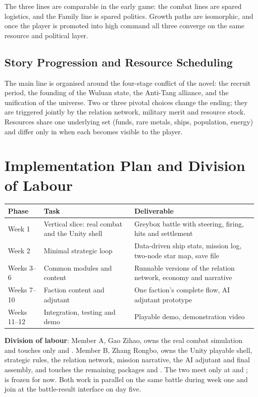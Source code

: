 \documentclass[11pt,a4paper]{article}
\begin{document}
The three lines are comparable in the early game: the combat lines are spared logistics, and the
Family line is spared politics. Growth paths are isomorphic, and once the player is promoted into
high command all three converge on the same resource and political layer.

\subsection{Story Progression and Resource Scheduling}
The main line is organised around the four-stage conflict of the novel: the recruit period, the
founding of the Wuluan state, the Anti-Tang alliance, and the unification of the universe.
Two or three pivotal choices change the ending; they are triggered jointly by the relation network,
military merit and resource stock. Resources share one underlying set (funds, rare metals, ships,
population, energy) and differ only in when each becomes visible to the player.

\section{Implementation Plan and Division of Labour}

\begin{table}[h]
\centering
\small
\begin{tabular}{@{}>{\raggedright\arraybackslash}p{}>{\raggedright\arraybackslash}p{}>{\raggedright\arraybackslash}p{}@{}}
\toprule
Phase & Task & Deliverable \\
\midrule
Week 1 & Vertical slice: real combat and the Unity shell &
Greybox battle with steering, firing, hits and settlement \\
Week 2 & Minimal strategic loop &
Data-driven ship stats, mission log, two-node star map, save file \\
Weeks 3--6 & Common modules and content &
Runnable versions of the relation network, economy and narrative \\
Weeks 7--10 & Faction content and adjutant &
One faction's complete flow, AI adjutant prototype \\
Weeks 11--12 & Integration, testing and demo &
Playable demo, demonstration video \\
\bottomrule
\end{tabular}
\end{table}

\noindent\textbf{Division of labour}: Member A, Gao Zihao, owns the real combat simulation and
touches only  and . Member B, Zhang Rongbo, owns the
Unity playable shell, strategic rules, the relation network, mission narrative, the AI adjutant and
final assembly, and touches the remaining packages and . The two meet only at
 and ;  is frozen for now.
Both work in parallel on the same battle during week one and join at the battle-result interface
on day five.
\end{document}
